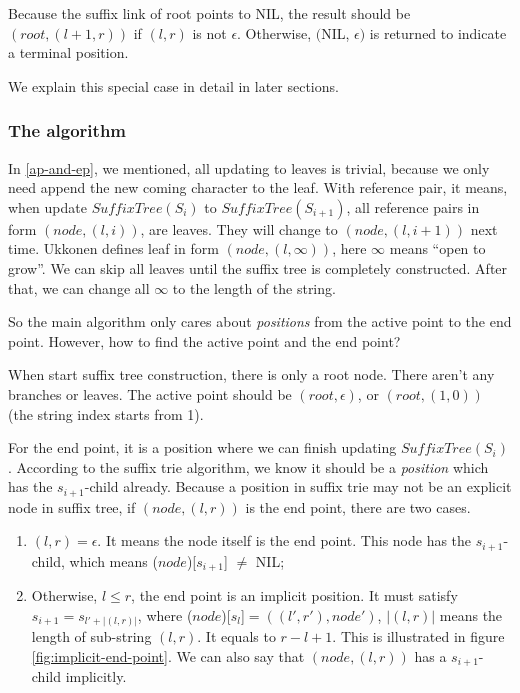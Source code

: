 \documentclass[UTF8]{article}
\begin{document}
Because the suffix link of root points to NIL, the result should be
$(root, (l+1, r))$ if $(l, r)$ is not $\epsilon$. Otherwise,
$($NIL, $\epsilon)$ is returned to indicate a terminal position.

We explain this special case in detail in later sections.

\subsubsection{The algorithm}

In \ref{ap-and-ep}, we mentioned, all updating to leaves is trivial, because we
only need append the new coming character to the leaf. With reference pair,
it means, when update $SuffixTree(S_i)$ to $SuffixTree(S_{i+1})$,
all reference pairs in form $(node, (l, i))$, are leaves. They will
change to $(node, (l, i+1))$ next time. Ukkonen defines leaf in form
$(node, (l, \infty))$, here $\infty$ means ``open to grow''. We can skip all
leaves until the suffix tree is completely constructed. After that, we can
change all $\infty$ to the length of the string.

So the main algorithm only cares about {\em positions} from the active point
to the end point. However, how to find the active point and the end point?

When start suffix tree construction, there is only a root node. There aren't
any branches or leaves. The active point should be $(root, \epsilon)$, or
$(root, (1, 0))$ (the string index starts from 1).

For the end point, it is a position where we can finish updating $SuffixTree(S_i)$.
According to the suffix trie algorithm, we know it should be a
{\em position} which has the $s_{i+1}$-child already. Because a position
in suffix trie may not be an explicit node in suffix tree, if $(node, (l, r))$
is the end point, there are two cases.

\begin{enumerate}
\item $(l, r)=\epsilon$. It means the node itself is the end point. This node has the
$s_{i+1}$-child, which means ($node$)[$s_{i+1}$] $\neq$ NIL;
\item Otherwise, $l \leq r$, the end point is an implicit position.
It must satisfy $s_{i+1}=s_{l'+|(l, r)|}$, where
($node$)[$s_l$]$=((l', r'), node')$, $|(l, r)|$ means
the length of sub-string $(l, r)$. It equals to $r-l+1$.
This is illustrated in figure \ref{fig:implicit-end-point}. We can
also say that $(node, (l, r))$ has a $s_{i+1}$-child implicitly.
\end{enumerate}
\end{document}
